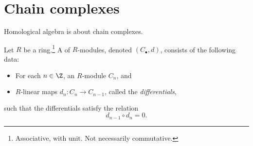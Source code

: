 \documentclass[main.tex]{subfiles}
\begin{document}
\chapter{Chain complexes}
\label{ch:chain_complexes}

Homological algebra is about chain complexes.
\begin{definition}
  \label{def:chain_complex}
  Let $R$ be a ring.\footnote{Associative, with unit. Not necessarily commutative.} A  of $R$-modules, denoted $(C_{\bullet}, d)$, consists of the following data:
  \begin{itemize}
    \item For each $n \in \Z$, an $R$-module $C_{n}$, and

    \item $R$-linear maps $d_{n}\colon C_{n} \to C_{n-1}$, called the \emph{differentials},
  \end{itemize}
  such that the differentials satisfy the relation
  \begin{equation*}
    d_{n-1} \circ d_{n} = 0.
  \end{equation*}
\end{definition}
\end{document}

